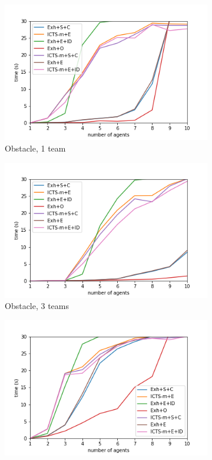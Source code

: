 \documentclass[english]{article}
\begin{document}
\begin{figure}
\begin{subfigure}{0.49\textwidth}
			\includegraphics[width=\linewidth]{img/results/obstacle-1}
			\caption{Obstacle, 1 team}
			\label{fig:obstacle1}
		\end{subfigure}
		\begin{subfigure}{0.49\textwidth}
			\centering
			\includegraphics[width=\linewidth]{img/results/obstacle-3}
			\caption{Obstacle, 3 teams}
			\label{fig:obstacle3}
		\end{subfigure}
		\begin{subfigure}{0.49\textwidth}
			\centering
			\includegraphics[width=\linewidth]{img/results/maze-1}

\end{subfigure}
\end{figure}
\end{document}
